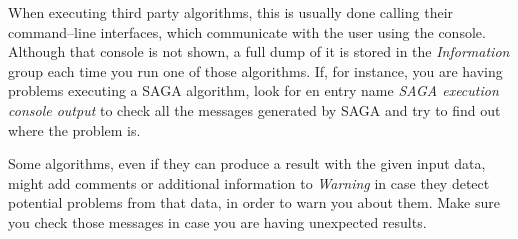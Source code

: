 When executing third party algorithms, this is usually done calling their command--line interfaces, which communicate with the user using the console. Although that console is not shown, a full dump of it is stored in the \emph{Information} group each time you run one of those algorithms. If, for instance, you are having problems executing a SAGA algorithm, look for en entry name \emph{SAGA execution console output} to check all the messages generated by SAGA and try to find out where the problem is.

Some algorithms, even if they can produce a result with the given input data, might add comments or additional information to \emph{Warning} in case they detect potential problems from that data, in order to warn you about them. Make sure you check those messages in case you are having unexpected results.
